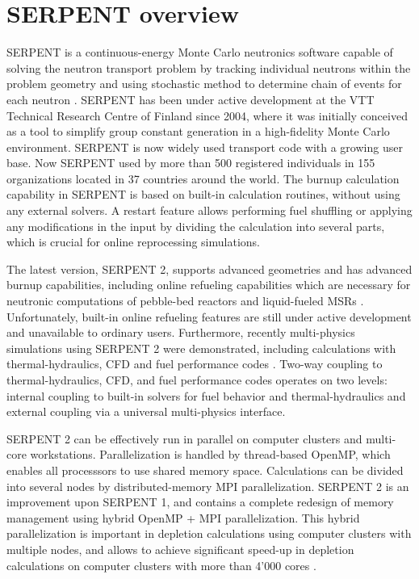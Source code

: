 \section{SERPENT overview}
SERPENT is a continuous-energy Monte Carlo neutronics software capable of solving the neutron transport problem by tracking individual neutrons within the problem geometry and using stochastic method to determine chain of events for each neutron \cite{leppanen_serpent_2015}. SERPENT has been under active development at the VTT Technical Research Centre of Finland since 2004, where it was initially conceived as a tool to simplify group constant generation in a high-fidelity Monte Carlo environment. SERPENT is now widely used transport code  with a growing user base. Now SERPENT used by more than 500 registered individuals in 155 organizations located in 37 countries around the world. The burnup calculation capability in SERPENT is based on built-in calculation routines, without using any external solvers. A restart feature allows performing fuel shuffling or applying any modifications in the input by dividing the calculation into several parts, which is crucial for online reprocessing simulations.

The latest version, SERPENT 2, supports advanced geometries and has advanced burnup capabilities, including online refueling capabilities which are necessary for neutronic computations of pebble-bed reactors and liquid-fueled \glspl{MSR} \cite{aufiero_extended_2013}. Unfortunately, built-in online refueling features are still under active development and unavailable to ordinary users. Furthermore, recently multi-physics simulations using SERPENT 2 were demonstrated, including  calculations with thermal-hydraulics, \gls{CFD} and fuel performance codes \cite{leppanen_numerical_2015}. Two-way coupling to thermal-hydraulics, \gls{CFD}, and fuel performance codes operates on two levels: internal coupling to built-in solvers for fuel behavior and thermal-hydraulics and external coupling via a universal multi-physics interface. 

SERPENT 2 can be effectively run in parallel on computer clusters and multi-core workstations. Parallelization is handled by thread-based OpenMP, which enables all processsors to use shared memory space. Calculations can be divided into several nodes by distributed-memory \gls{MPI} parallelization. SERPENT 2  is an improvement upon SERPENT 1, and contains a complete redesign of memory management using hybrid OpenMP \cite{dagum_openmp_1998} + \gls{MPI} parallelization.  This hybrid parallelization is important in depletion calculations using computer clusters with multiple nodes, and allows to achieve significant speed-up in depletion calculations on computer clusters with more than 4'000 cores \cite{leppanen_serpent_2015}. 


